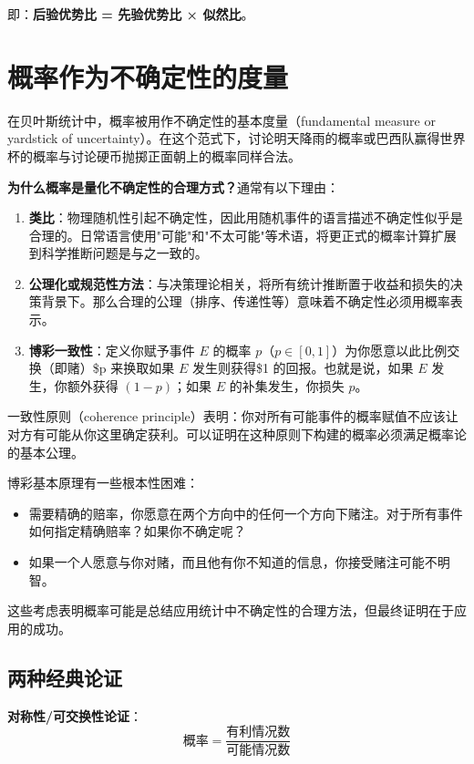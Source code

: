 即：\textbf{后验优势比 = 先验优势比 × 似然比}。

\section{概率作为不确定性的度量}

在贝叶斯统计中，概率被用作不确定性的基本度量（fundamental measure or yardstick of uncertainty）。在这个范式下，讨论明天降雨的概率或巴西队赢得世界杯的概率与讨论硬币抛掷正面朝上的概率同样合法。

\textbf{为什么概率是量化不确定性的合理方式？}通常有以下理由：

\begin{enumerate}
  \item \textbf{类比}：物理随机性引起不确定性，因此用随机事件的语言描述不确定性似乎是合理的。日常语言使用"可能"和"不太可能"等术语，将更正式的概率计算扩展到科学推断问题是与之一致的。

  \item \textbf{公理化或规范性方法}：与决策理论相关，将所有统计推断置于收益和损失的决策背景下。那么合理的公理（排序、传递性等）意味着不确定性必须用概率表示。

  \item \textbf{博彩一致性}：定义你赋予事件 $E$ 的概率 $p$（$p \in [0, 1]$）为你愿意以此比例交换（即赌）\$p 来换取如果 $E$ 发生则获得\$1 的回报。也就是说，如果 $E$ 发生，你额外获得 $(1-p)$；如果 $E$ 的补集发生，你损失 $p$。
\end{enumerate}

一致性原则（coherence principle）表明：你对所有可能事件的概率赋值不应该让对方有可能从你这里确定获利。可以证明在这种原则下构建的概率必须满足概率论的基本公理。

博彩基本原理有一些根本性困难：
\begin{itemize}
  \item 需要精确的赔率，你愿意在两个方向中的任何一个方向下赌注。对于所有事件如何指定精确赔率？如果你不确定呢？
  \item 如果一个人愿意与你对赌，而且他有你不知道的信息，你接受赌注可能不明智。
\end{itemize}

这些考虑表明概率可能是总结应用统计中不确定性的合理方法，但最终证明在于应用的成功。

\subsection{两种经典论证}

\textbf{对称性/可交换性论证}：
\[
\text{概率} = \frac{\text{有利情况数}}{\text{可能情况数}}
\]


